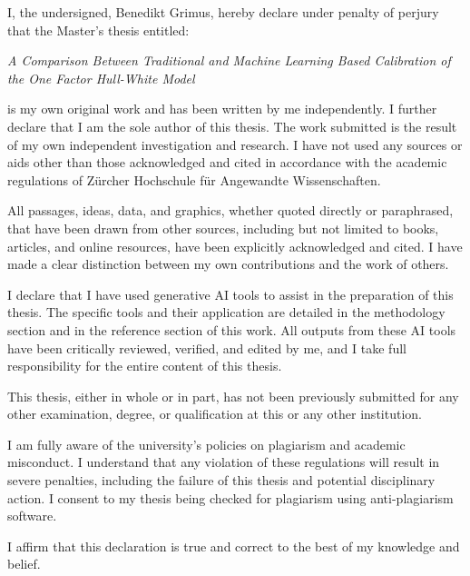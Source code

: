 I, the undersigned, Benedikt Grimus, hereby declare under penalty of perjury that the Master's thesis entitled:

\vspace{0.3cm}
\begin{center}
    \textit{A Comparison Between Traditional and Machine Learning Based Calibration of the One Factor Hull-White Model}
\end{center}
\vspace{0.3cm}

is my own original work and has been written by me independently. I further declare that I am the sole author of this thesis. The work submitted is the result of my own independent investigation and research. I have not used any sources or aids other than those acknowledged and cited in accordance with the academic regulations of Zürcher Hochschule für Angewandte Wissenschaften.

All passages, ideas, data, and graphics, whether quoted directly or paraphrased, that have been drawn from other sources, including but not limited to books, articles, and online resources, have been explicitly acknowledged and cited. I have made a clear distinction between my own contributions and the work of others.

I declare that I have used generative AI tools to assist in the preparation of this thesis. The specific tools and their application are detailed in the methodology section and in the reference section of this work. All outputs from these AI tools have been critically reviewed, verified, and edited by me, and I take full responsibility for the entire content of this thesis.

This thesis, either in whole or in part, has not been previously submitted for any other examination, degree, or qualification at this or any other institution.

I am fully aware of the university's policies on plagiarism and academic misconduct. I understand that any violation of these regulations will result in severe penalties, including the failure of this thesis and potential disciplinary action. I consent to my thesis being checked for plagiarism using anti-plagiarism software.

I affirm that this declaration is true and correct to the best of my knowledge and belief.

\vspace{1cm}

